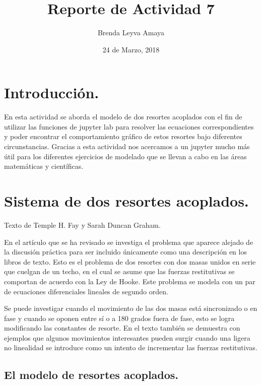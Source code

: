 \documentclass{article} %
\title{Reporte de Actividad 7}
\author{Brenda Leyva Amaya}
\date{24 de Marzo, 2018}
\begin{document}
\maketitle %


\section{Introducción.}

En esta actividad se aborda el modelo de dos resortes acoplados con el fin de utilizar las funciones de jupyter lab para resolver las ecuaciones correspondientes y poder encontrar el comportamiento gráfico de estos resortes bajo diferentes circunstancias. Gracias a esta actividad nos acercamos a un jupyter mucho más útil para los diferentes ejercicios de modelado que se llevan a cabo en las áreas matemáticas y científicas. 

\section{Sistema de dos resortes acoplados.}

Texto de Temple H. Fay y Sarah Duncan Graham.

\vspace{0.5 cm}

En el artículo que se ha revisado se investiga el problema que aparece alejado de la discusión práctica para ser incluido únicamente como una descripción en los libros de texto. Esto es el problema de dos resortes con dos masas unidos en serie que cuelgan de un techo, en el cual se asume que las fuerzas restitutivas se comportan de acuerdo con la Ley de Hooke. Este problema se modela con un par de ecuaciones diferenciales lineales de segundo orden. 

\vspace{0.5 cm}

Se puede investigar cuando el movimiento de las dos masas está sincronizado o en fase y cuando se oponen entre sí o a 180 grados fuera de fase, esto se logra modificando las constantes de resorte. En el texto también se demuestra con ejemplos que algunos movimientos interesantes pueden surgir cuando una ligera no linealidad se introduce como un intento de incrementar las fuerzas restitutivas. 

\subsection{El modelo de resortes acoplados.}
\end{document}
